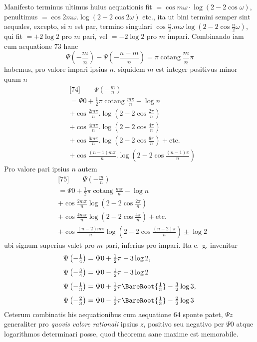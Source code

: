 Manifesto terminus ultimus huius aequationis fit $=\cos m\omega\cdot\log(2-2\cos\omega)$, penultimus $=\cos 2m\omega.\log(2-2\cos 2\omega)$ etc., ita ut bini termini semper sint aequales, excepto, si $n$ est par, termino singulari $\cos\frac{n}{2}.m\omega\log(2-2\cos\frac{n}{2}\omega)$, qui fit $=+2\log 2$ pro $m$ pari, vel $=-2\log 2$ pro $m$ impari. Combinando iam cum aequatione 73 hanc
\[
\Psi\left(-\frac{m}{n}\right)-\Psi\left(-\frac{n-m}{n}\right)=\pi\operatorname{cotang}\frac{m}{n}\pi
\]
habemus, pro valore impari ipsius $n$, siquidem $m$ est integer positivus minor quam $n$
\[
\begin{aligned}
&{}\text{[74]}\qquad \Psi\left(-\frac{m}{n}\right)
\\[4pt]
&=\Psi 0+\tfrac12\pi\operatorname{cotang}\frac{m\pi}{n}-\log n\\[4pt]
&+\cos\frac{2m\pi}{n}.\log\left(2-2\cos\frac{2\pi}{n}\right)
\\[4pt]
&+\cos\frac{4m\pi}{n}.\log\left(2-2\cos\frac{4\pi}{n}\right)\\[4pt]
&+\cos\frac{6m\pi}{n}.\log\left(2-2\cos\frac{6\pi}{n}\right)+\text{etc.}
\\[4pt]
&+\cos\frac{(n-1)m\pi}{n}.\log\left(2-2\cos\frac{(n-1)\pi}{n}\right)
\end{aligned}
\]
Pro valore pari ipsius $n$ autem
\[
\begin{aligned}
&{}\text{[75]}\qquad \Psi\left(-\frac{m}{n}\right)
\\[4pt]
&=\Psi 0+\tfrac12\pi\operatorname{cotang}\frac{m\pi}{n}-\log n\\[4pt]
&+\cos\frac{2m\pi}{n}\log\left(2-2\cos\frac{2\pi}{n}\right)
\\[4pt]
&+\cos\frac{4m\pi}{n}\log\left(2-2\cos\frac{4\pi}{n}\right)+\text{etc.}\\[4pt]
&+\cos\frac{(n-2)m\pi}{n}\log\left(2-2\cos\frac{(n-2)\pi}{n}\right)
\pm\log 2
\end{aligned}
\]
ubi signum superius valet pro $m$ pari, inferius pro impari. Ita e.~g. invenitur
\[
\begin{aligned}
&\Psi\left(-\tfrac14\right)=\Psi 0+\tfrac12\pi-3\log 2, 
\\[4pt]
&\Psi\left(-\tfrac34\right)=\Psi 0-\tfrac12\pi-3\log 2
\\[4pt]
&\Psi\left(-\tfrac13\right)=\Psi 0+\tfrac12\pi\BareRoot{\tfrac13}-\tfrac32\log 3, 
\\[4pt]
&\Psi\left(-\tfrac23\right)=\Psi 0-\tfrac12\pi\BareRoot{\tfrac13}-\tfrac22\log 3
\end{aligned}
\]
Ceterum combinatis his aequationibus cum aequatione 64 sponte patet, $\Psi z$ generaliter pro \emph{quovis valore rationali} ipsius $z$, positivo seu negativo per $\Psi 0$ atque logarithmos determinari posse, quod theorema sane maxime est memorabile.

